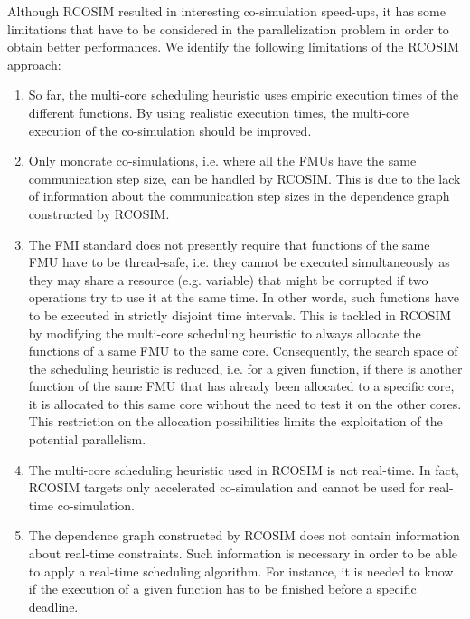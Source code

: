 Although RCOSIM resulted in interesting co-simulation speed-ups, it has some limitations that have to be considered in the parallelization problem in order to obtain better performances. We identify the following limitations of the RCOSIM approach:

\begin{enumerate}

\item So far, the multi-core scheduling heuristic uses empiric execution times of the different functions. By using realistic execution times, the multi-core execution of the co-simulation should be improved.

\item Only monorate co-simulations, i.e. where all the FMUs have the same communication step size, can be handled by RCOSIM. This is due to the lack of information about the communication step sizes in the dependence graph constructed by RCOSIM.

\item The FMI standard does not presently require that functions of the same FMU have to be thread-safe, i.e. they cannot be executed simultaneously as they may share a resource (e.g. variable) that might be corrupted if two operations try to use it at the same time. In other words, such functions have to be executed in strictly disjoint time intervals. This is tackled in RCOSIM by modifying the multi-core scheduling heuristic to always allocate the functions of a same FMU to the same core. Consequently, the search space of the scheduling heuristic is reduced, i.e. for a given function, if there is another function of the same FMU that has already been allocated to a specific core, it is allocated to this same core without the need to test it on the other cores. This restriction on the allocation possibilities limits the exploitation of the potential parallelism.

\item The multi-core scheduling heuristic used in RCOSIM is not real-time. In fact, RCOSIM targets only accelerated co-simulation and cannot be used for real-time co-simulation.

\item The dependence graph constructed by RCOSIM does not contain information about real-time constraints. Such information is necessary in order to be able to apply a real-time scheduling algorithm. For instance, it is needed to know if the execution of a given function has to be finished before a specific deadline.

\end{enumerate} 

